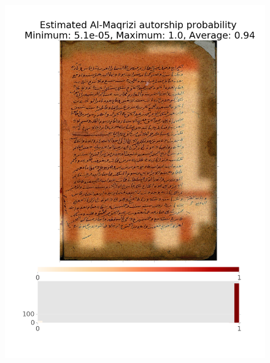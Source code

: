 \documentclass[conference,a4paper,twocolumn]{IEEEtran}
\begin{document}
\begin{figure}
\centering
\begin{minipage}{.45\linewidth}
  \includegraphics[width=\linewidth]{figures/sw_al_maqrisi.png}
  \label{img1}
\end{minipage}
\hspace{.05\linewidth}
\begin{minipage}{.45\linewidth}

\end{minipage}
\end{figure}
\end{document}

